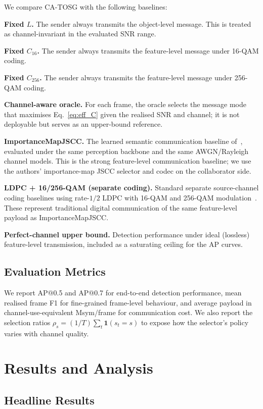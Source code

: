 \documentclass[journal]{IEEEtran}
\newcommand{\method}{CA-TOSG}
\begin{document}
We compare \method{} with the following baselines:

\textbf{Fixed $L$.} The sender always transmits the object-level message. This is treated as channel-invariant in the evaluated SNR range.

\textbf{Fixed $C_{16}$.} The sender always transmits the feature-level message under 16-QAM coding.

\textbf{Fixed $C_{256}$.} The sender always transmits the feature-level message under 256-QAM coding.

\textbf{Channel-aware oracle.} For each frame, the oracle selects the message mode that maximises Eq.~\eqref{eq:eff_C} given the realised SNR and channel; it is not deployable but serves as an upper-bound reference.

\textbf{ImportanceMapJSCC.} The learned semantic communication baseline of~\cite{sheng2024importance}, evaluated under the same perception backbone and the same AWGN/Rayleigh channel models. This is the strong feature-level communication baseline; we use the authors' importance-map JSCC selector and codec on the collaborator side.

\textbf{LDPC + 16/256-QAM (separate coding).} Standard separate source-channel coding baselines using rate-$1/2$ LDPC with 16-QAM and 256-QAM modulation~\cite{ieee80211bd}. These represent traditional digital communication of the same feature-level payload as ImportanceMapJSCC.

\textbf{Perfect-channel upper bound.} Detection performance under ideal (lossless) feature-level transmission, included as a saturating ceiling for the AP curves.

\subsection{Evaluation Metrics}

We report AP@0.5 and AP@0.7 for end-to-end detection performance, mean realised frame F1 for fine-grained frame-level behaviour, and average payload in channel-use-equivalent Msym/frame for communication cost. We also report the selection ratios $\rho_s = (1/T)\sum_t \mathbf{1}(s_t=s)$ to expose how the selector's policy varies with channel quality.

\section{Results and Analysis}

\subsection{Headline Results}\label{sec:headline}
\end{document}
